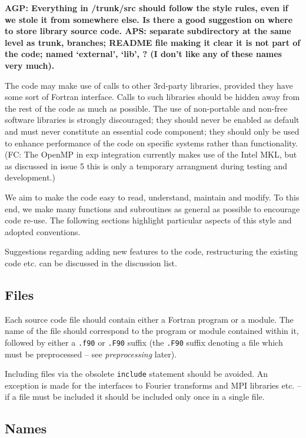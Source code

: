 \documentclass[12pt,twoside,notitlepage,a4paper]{article}
\newcommand{\file}[1]{\texttt{#1}}
\newcommand{\code}[1]{\texttt{#1}}
\begin{document}
{\bf AGP: Everything in /trunk/src should follow the style rules, even if we 
stole it from somewhere else. Is there a good suggestion on where to store library 
source code. APS: separate subdirectory at the same level as trunk, branches; 
README file making it clear it is not part
of the code; named `external', `lib', ? (I don't like any of these names very  much). }

The code may make use of calls to other 3rd-party libraries, provided they have
some sort of Fortran interface. Calls to such libraries should be hidden away
from the rest of the code as much as possible. The use of non-portable and
non-free software libraries is strongly discouraged; they should never be
enabled as default and must never constitute an essential code component;
they should only be used to enhance performance of the code on specific systems
rather than functionality. (FC: The OpenMP in exp integration currently makes use of the Intel MKL, 
but as discussed in issue 5 this is only a temporary arrangment during testing and development.)

We aim to make the code easy to read, understand, maintain and modify. 
To this end, we make many functions and subroutines as general as possible to encourage code re-use.
The following sections highlight particular aspects of this style and adopted conventions.

Suggestions regarding adding new features to the code, restructuring the existing code etc. can be discussed in the discussion list.

\subsection{Files}

Each source code file should contain either a Fortran program or a module.
The name of the file should correspond to the program or module contained within it,
followed by either a \file{.f90} or \file{.F90} suffix (the \file{.F90} suffix
denoting a file which must be preprocessed -- see {\it preprocessing} later). 

Including files via the obsolete \code{include} statement should be avoided.
An exception is made for the interfaces to Fourier transforms and MPI libraries etc. -- if a file
must be included it should be included only once in a single file.

\subsection{Names}
\end{document}

